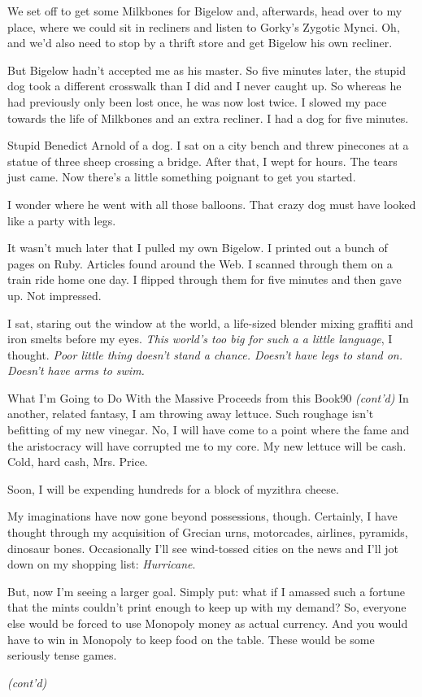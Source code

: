 \documentclass[12pt,twoside]{report}
\begin{document}
We set off to get some Milkbones for Bigelow and, afterwards, head
over to my place, where we could sit in recliners and listen to
Gorky's Zygotic Mynci.  Oh, and we'd also need to stop by a thrift
store and get Bigelow his own recliner.

But Bigelow hadn't accepted me as his master.  So five minutes later,
the stupid dog took a different crosswalk than I did and I never
caught up.  So whereas he had previously only been lost once, he was
now lost twice.  I slowed my pace towards the life of Milkbones and an
extra recliner.  I had a dog for five minutes.

Stupid Benedict Arnold of a dog.  I sat on a city bench and threw
pinecones at a statue of three sheep crossing a bridge.  After that, I
wept for hours.  The tears just came.  Now there's a little something
poignant to get you started.

I wonder where he went with all those balloons.  That crazy dog must
have looked like a party with legs.

It wasn't much later that I pulled my own Bigelow.  I printed out a
bunch of pages on Ruby.  Articles found around the Web.  I scanned
through them on a train ride home one day.  I flipped through them for
five minutes and then gave up.  Not impressed.

I sat, staring out the window at the world, a life-sized blender
mixing graffiti and iron smelts before my eyes.  {\em This world's too
  big for such a a little language}, I thought. {\em Poor little thing
  doesn't stand a chance.  Doesn't have legs to stand on.  Doesn't
  have arms to swim.}


	\begin{sidebar}{What I'm Going to Do With the Massive Proceeds from this Book}{90}
	\textit{(cont'd)} In another, related fantasy, I am throwing away lettuce. Such roughage isn't befitting of my new vinegar. No, I will have come to a point where the fame and the aristocracy will have corrupted me to my core. My new lettuce will be cash. Cold, hard cash, Mrs. Price.\vspace{6pt}
	
	Soon, I will be expending hundreds for a block of myzithra cheese.\vspace{6pt}

	My imaginations have now gone beyond possessions, though. Certainly, I have thought through my acquisition of Grecian urns, motorcades, airlines, pyramids, dinosaur bones. Occasionally I'll see wind-tossed cities on the news and I'll jot down on my shopping list: \textit{Hurricane}.\vspace{6pt}

	But, now I'm seeing a larger goal. Simply put: what if I amassed such a fortune that the mints couldn't print enough to keep up with my demand? So, everyone else would be forced to use Monopoly money as actual currency. And you would have to win in Monopoly to keep food on the table. These would be some seriously tense games. \vspace{6pt}

	\textit{(cont'd)} \vspace{6pt}
	\end{sidebar}
\end{document}
